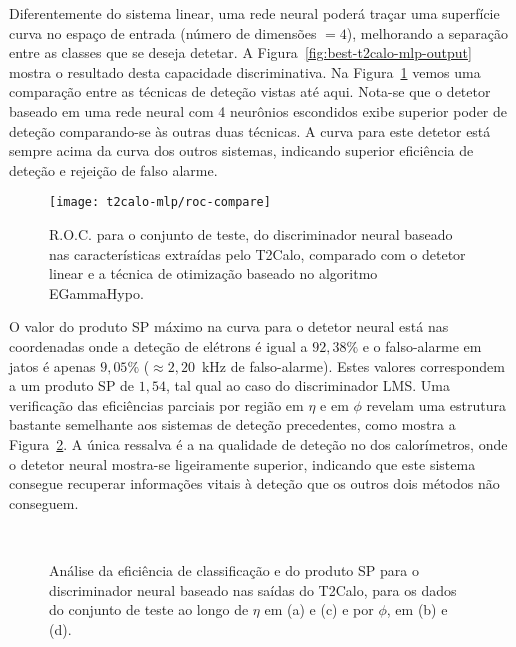 Diferentemente do sistema linear, uma rede neural poderá traçar uma superfície
curva no espaço de entrada (número de dimensões $=4$), melhorando a separação
entre as classes que se deseja detetar. A
Figura~\ref{fig:best-t2calo-mlp-output} mostra o resultado desta capacidade
discriminativa. Na Figura~\ref{fig:best-t2calo-test-roc} vemos uma comparação
entre as técnicas de deteção vistas até aqui. Nota-se que o detetor baseado em
uma rede neural com 4 neurônios escondidos exibe superior poder de deteção
comparando-se às outras duas técnicas. A curva para este detetor está sempre
acima da curva dos outros sistemas, indicando superior eficiência de deteção e
rejeição de falso alarme.

\begin{figure}
\begin{center}
\texttt{[image: t2calo-mlp/roc-compare]}
\end{center}
\caption{R.O.C. para o conjunto de teste, do discriminador neural baseado nas
características extraídas pelo T2Calo, comparado com o detetor linear e a
técnica de otimização baseado no algoritmo EGammaHypo.}
\label{fig:best-t2calo-test-roc}
\end{figure}

O valor do produto SP máximo na curva para o detetor neural está nas
coordenadas onde a deteção de elétrons é igual a $92,38\%$ e o falso-alarme em
jatos é apenas $9,05\%$ ($\approx 2,20$~kHz de falso-alarme). Estes valores
correspondem a um produto SP de $1,54$, tal qual ao caso do discriminador
LMS. Uma verificação das eficiências parciais por região em $\eta$ e em $\phi$
revelam uma estrutura bastante semelhante aos sistemas de deteção precedentes,
como mostra a Figura~\ref{fig:best-t2calo-eta-phi}. A única ressalva é a na
qualidade de deteção no  dos calorímetros, onde o detetor neural
mostra-se ligeiramente superior, indicando que este sistema consegue recuperar
informações vitais à deteção que os outros dois métodos não conseguem.

\begin{figure}
\begin{center}
\mbox{%
}
\mbox{%
}
\end{center}
\caption{Análise da eficiência de classificação e do produto SP para o
discriminador neural baseado nas saídas do T2Calo, para os dados do conjunto
de teste ao longo de $\eta$ em (a) e (c) e por $\phi$, em (b) e (d).}
\label{fig:best-t2calo-eta-phi}
\end{figure}

